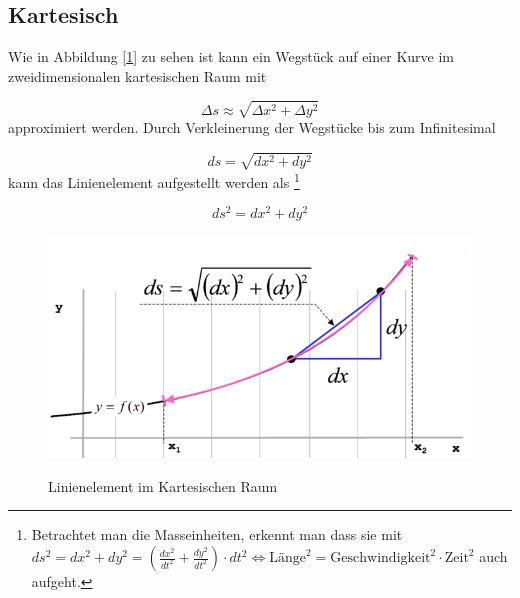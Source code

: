 %
%
%
%
\subsection{Kartesisch\label{geodaeten:section:Linienelemente:Kartesisch}}

Wie in Abbildung [\ref{geodaeten:figure:Linienelemente:Kartesisch:figure1}] zu sehen ist kann ein Wegstück auf einer Kurve im zweidimensionalen kartesischen Raum mit

\begin{equation}
	\Delta s \approx \sqrt{\Delta x^2 + \Delta y^2}
\end{equation}
approximiert werden.
Durch Verkleinerung der Wegstücke bis zum Infinitesimal 

\begin{equation}
	d s = \sqrt{d x^2 + d y^2}
\end{equation}
kann das Linienelement aufgestellt werden als \footnote{
Betrachtet man die Masseinheiten, erkennt man dass sie mit $ds^2 = dx^2 + dy^2 = \left( \frac{dx^2}{dt^2}+\frac{dy^2}{dt^2} \right) \cdot dt^2 \Leftrightarrow \text{Länge}^2 = \text{Geschwindigkeit}^2 \cdot \text{Zeit}^2$ auch aufgeht.
}

\begin{equation}
 	ds^2 = d x^2 + d y^2
 	\label{geodaeten:equation:Linienelemente:Kartesisch:equation1}
\end{equation}



\begin{figure}
	\centering
	\includegraphics[width=0.7\linewidth]{papers/geodaeten/Abbildungen/Linienelemente/LinKartes1}
	\caption{Linienelement im Kartesischen Raum}
	\label{geodaeten:figure:Linienelemente:Kartesisch:figure1}
	\cite{geodaeten:kartesisch}
\end{figure}
